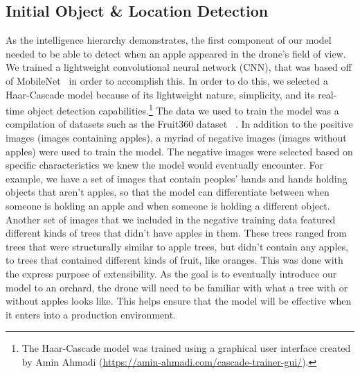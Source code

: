 \subsection{Initial Object \& Location Detection}\label{subsec:initial-object
-&-location-detection}
As the intelligence hierarchy demonstrates, the first component of our model needed
to be able to detect when an apple appeared in the drone's field of view.
We trained a lightweight convolutional neural network (CNN), that was based off of
MobileNet~\cite{Sandler2018,PyTorchMobileNet} in order to accomplish this.
In order to do this, we selected a Haar-Cascade model because of its lightweight
nature, simplicity, and its real-time object detection capabilities.\footnote{The
Haar-Cascade model was trained using a graphical user interface created by Amin
Ahmadi (\url{https://amin-ahmadi.com/cascade-trainer-gui/}).}
The data we used to train the model was a compilation of datasets such as the
Fruit360 dataset ~\cite{Fruit360}.
In addition to the positive images (images containing apples), a myriad of negative
images (images without apples) were used to train the model.
The negative images were selected based on specific characteristics we knew the model
would eventually encounter.
For example, we have a set of images that contain peoples' hands and hands holding
objects that aren't apples, so that the model can differentiate between when someone
is holding an apple and when someone is holding a different object.
Another set of images that we included in the negative training data featured
different kinds of trees that didn't have apples in them.
These trees ranged from trees that were structurally similar to apple trees, but
didn't contain any apples, to trees that contained different kinds of fruit, like
oranges.
This was done with the express purpose of extensibility.
As the goal is to eventually introduce our model to an orchard, the drone will need
to be familiar with what a tree with or without apples looks like.
This helps ensure that the model will be effective when it enters into a production
environment.
